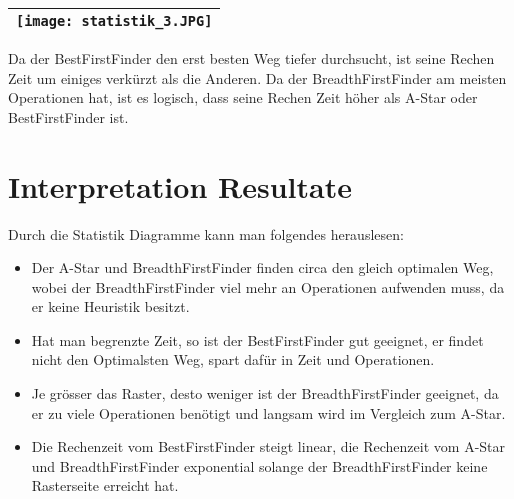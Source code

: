 \begin{longtable}[]{@{}l@{}}
\toprule
\endhead
\texttt{[image: statistik\_3.JPG]}\tabularnewline
\bottomrule
\end{longtable}

Da der BestFirstFinder den erst besten Weg tiefer durchsucht, ist seine
Rechen Zeit um einiges verkürzt als die Anderen. Da der
BreadthFirstFinder am meisten Operationen hat, ist es logisch, dass
seine Rechen Zeit höher als A-Star oder BestFirstFinder ist.

\section{Interpretation Resultate}

Durch die Statistik Diagramme kann man folgendes herauslesen:

\begin{itemize}
\item
  Der A-Star und BreadthFirstFinder finden circa den gleich optimalen Weg,
  wobei der BreadthFirstFinder viel mehr an Operationen aufwenden muss,
  da er keine Heuristik besitzt.
\item
  Hat man begrenzte Zeit, so ist der BestFirstFinder gut geeignet, er
  findet nicht den Optimalsten Weg, spart dafür in Zeit und Operationen.
\item
  Je grösser das Raster, desto weniger ist der BreadthFirstFinder
  geeignet, da er zu viele Operationen benötigt und langsam wird im
  Vergleich zum A-Star.
\item
  Die Rechenzeit vom BestFirstFinder steigt linear, die Rechenzeit vom
  A-Star und BreadthFirstFinder exponential solange der
  BreadthFirstFinder keine Rasterseite erreicht hat.
\end{itemize}

